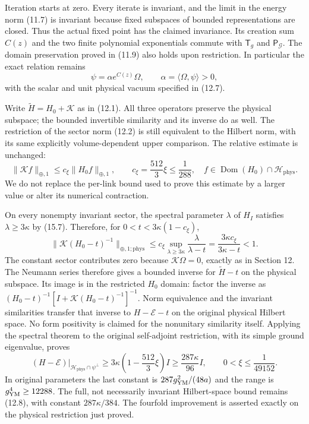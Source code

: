 \documentclass[
]{article}
\begin{document}
Iteration starts at zero. Every iterate is invariant, and the limit in
the energy norm (11.7) is invariant because fixed subspaces of bounded
representations are closed. Thus the actual fixed point has the claimed
invariance. Its creation sum \(C(z)\) and the two finite polynomial
exponentials commute with \(\mathsf T_g\) and
\(\mathsf P_{\mathcal G}\). The domain preservation proved in (11.9)
also holds upon restriction. In particular the exact relation remains \[
\psi=\alpha e^{C(z)}\Omega,\qquad
\alpha=\langle\Omega,\psi\rangle>0,
\] with the scalar and unit physical vacuum specified in (12.7).

Write \(\widetilde H=H_0+\mathcal K\) as in (12.1). All three operators
preserve the physical subspace; the bounded invertible similarity and
its inverse do as well. The restriction of the sector norm (12.2) is
still equivalent to the Hilbert norm, with its same explicitly
volume-dependent upper comparison. The relative estimate is unchanged:
\[
\|\mathcal K f\|_{\oplus,1}
 \le c_\xi\|H_0 f\|_{\oplus,1},\qquad
c_\xi=\frac{512}{3}\xi\le\frac1{288},
\quad
f\in\operatorname{Dom}(H_0)\cap\mathcal H_{\mathrm{phys}}.
                                                               \tag{15.11}
\] We do not replace the per-link bound used to prove this estimate by a
larger value or alter its numerical contraction.

On every nonempty invariant sector, the spectral parameter \(\lambda\)
of \(H_I\) satisfies \(\lambda\ge3\kappa\) by (15.7). Therefore, for
\(0<t<3\kappa(1-c_\xi)\), \[
\|\mathcal K(H_0-t)^{-1}\|_{\oplus,1;\mathrm{phys}}
 \le c_\xi\sup_{\lambda\ge3\kappa}
               \frac{\lambda}{\lambda-t}
 =\frac{3\kappa c_\xi}{3\kappa-t}<1.                         \tag{15.12}
\] The constant sector contributes zero because \(\mathcal K\Omega=0\),
exactly as in Section 12. The Neumann series therefore gives a bounded
inverse for \(\widetilde H-t\) on the physical subspace. Its image is in
the restricted \(H_0\) domain: factor the inverse as
\((H_0-t)^{-1}[I+\mathcal K(H_0-t)^{-1}]^{-1}\). Norm equivalence and
the invariant similarities transfer that inverse to \(H-\mathcal E-t\)
on the original physical Hilbert space. No form positivity is claimed
for the nonunitary similarity itself. Applying the spectral theorem to
the original self-adjoint restriction, with its simple ground
eigenvalue, proves \[
(H-\mathcal E)\big|_{\mathcal H_{\mathrm{phys}}\cap\psi^\perp}
 \ge 3\kappa\left(1-\frac{512}{3}\xi\right)I
 \ge\frac{287\kappa}{96}I,
\qquad 0<\xi\le\frac1{49152}.                                \tag{15.13}
\] In original parameters the last constant is \(287g_{\rm YM}^2/(48a)\)
and the range is \(g_{\rm YM}^4\ge12288\). The full, not necessarily
invariant Hilbert-space bound remains (12.8), with constant
\(287\kappa/384\). The fourfold improvement is asserted exactly on the
physical restriction just proved.
\end{document}
